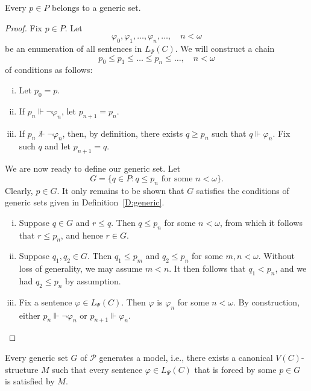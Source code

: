 \documentclass{scrartcl}
\renewcommand{\phi}{\varphi}
\begin{document}
\begin{lemma}
Every $p\in P$ belongs to a generic set.
\end{lemma}

\begin{proof}
Fix $p\in P$. Let
\[
\phi_0,\phi_1,\dots, \phi_n, \dots, \quad n<\omega
\]
be an enumeration of all sentences in $L_\Psi(C)$.
We will construct a chain
\[
p_0\le p_1\le \dots \le p_n \le \dots, \quad n<\omega
\]
of conditions as follows:
\begin{enumerate}[i)]
\item
Let $p_0=p$.
\item
If $p_n\Vdash\neg\phi_n$, let $p_{n+1}=p_n$.
\item
If $p_n\nVdash\neg\phi_n$, then, by definition, there exists $q\ge p_n$ such that $q\Vdash \phi_n$. Fix such $q$ and let $p_{n+1} = q$.
\end{enumerate}

We are now ready to define our generic set. Let
\[
G = \{ q\in P \colon q\le p_n \text{ for some } n<\omega \}.
\]
Clearly, $p\in G$. It only remains to be shown that $G$ satisfies the conditions of generic sets given in Definition~\ref{D:generic}.

\begin{enumerate}[i)]
\item
Suppose $q\in G$ and $r\le q$. Then $q\le p_n$ for some $n< \omega$, from which it follows that $r\le p_n$, and hence $r\in G$.

\item
Suppose $q_1,q_2\in G$. Then $q_1 \le p_m$ and $q_2 \le p_n$ for some $m,n < \omega$. Without loss of generality, we may assume $m < n$. It then follows that $q_1< p_n$, and we had $q_2 \le p_n$ by assumption.

\item
Fix a sentence $\phi \in L_\Psi(C)$. Then $\phi$ is $\phi_n$ for some $n < \omega$. By construction, either $p_n\Vdash \neg\phi_n$ or $p_{n+1}\Vdash \phi_n$.

\end{enumerate}
\end{proof}





\begin{lemma}
Every generic set $G$ of $\mathscr{P}$ generates a model, i.e., there exists a canonical $V(C)$-structure $M$ such that every sentence $\phi\in L_\Psi(C)$ that is forced by some $p\in G$ is satisfied by $M$.
\end{lemma}
\end{document}
